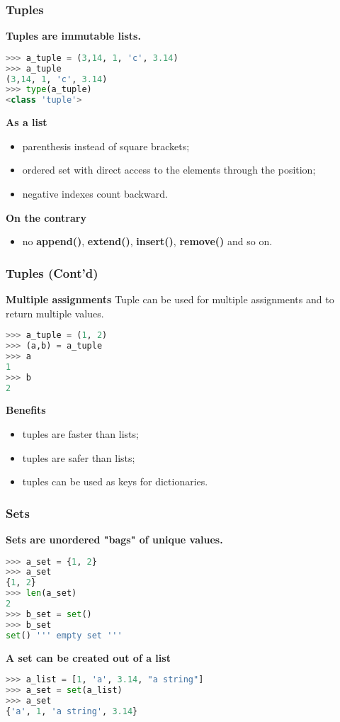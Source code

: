\subsubsection{Tuples}
\textbf{Tuples are immutable lists.}
\begin{lstlisting}[language=Python]
>>> a_tuple = (3,14, 1, 'c', 3.14)
>>> a_tuple
(3,14, 1, 'c', 3.14)
>>> type(a_tuple)
<class 'tuple'>
\end{lstlisting}
\textbf{As a list}
\begin{itemize}
	\item parenthesis instead of square brackets;
	\item ordered set with direct access to the elements through the position;
	\item negative indexes count backward.
\end{itemize}
\textbf{On the contrary}
\begin{itemize}
	\item no \textbf{append()}, \textbf{extend()}, \textbf{insert()}, \textbf{remove()} and so on.
\end{itemize}

\subsubsection{Tuples (Cont'd)}
\textbf{Multiple assignments}
Tuple can be used for multiple assignments and to return multiple values.
\begin{lstlisting}[language=Python]
>>> a_tuple = (1, 2)
>>> (a,b) = a_tuple
>>> a
1
>>> b
2
\end{lstlisting}
\textbf{Benefits}
\begin{itemize}
	\item tuples are faster than lists;
	\item tuples are safer than lists;
	\item tuples can be used as keys for dictionaries.
\end{itemize}

\subsubsection{Sets}
\textbf{Sets are unordered "bags" of unique values.}
\begin{lstlisting}[language=Python]
>>> a_set = {1, 2}
>>> a_set
{1, 2}
>>> len(a_set)
2
>>> b_set = set()
>>> b_set
set() ''' empty set '''
\end{lstlisting}
\textbf{A set can be created out of a list}
\begin{lstlisting}[language=Python]
>>> a_list = [1, 'a', 3.14, "a string"]
>>> a_set = set(a_list)
>>> a_set
{'a', 1, 'a string', 3.14}
\end{lstlisting}

